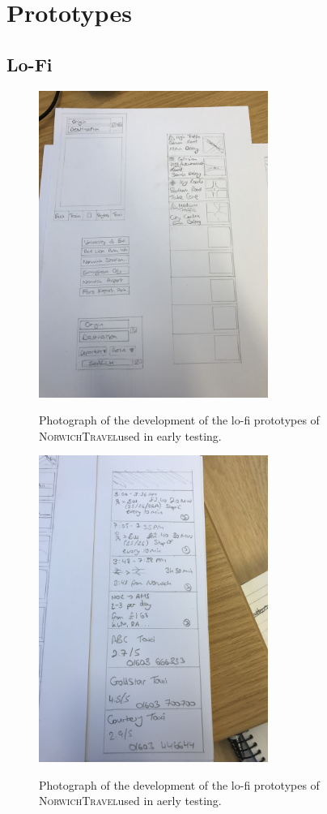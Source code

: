 \documentclass[cmpstyle]{ueacmpstyle}
\newcommand{\nt}{\textsc{NorwichTravel}}
\begin{document}
	
	
	
	\clearpage
	\appendix
	\section{Prototypes} \label{app:proto}
		\subsection{Lo-Fi} \label{app:lo-fi}
		\begin{figure}[h]
			\centering
			\includegraphics[height=10cm, angle=270]{images/lo-fi-1.jpg}\\
			\caption{Photograph of the development of the lo-fi prototypes of \nt used in early testing.}\label{fig:lo-fi-1}
		\end{figure}
		\begin{figure}[h!]
			\centering
			\includegraphics[height=10cm, angle=270]{images/lo-fi-2.jpg}\\
			\caption{Photograph of the development of the lo-fi prototypes of \nt used in aerly testing.}\label{fig:lo-fi-2}
		\end{figure}
		\clearpage
\end{document}
